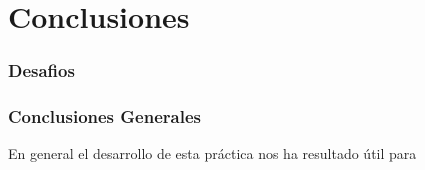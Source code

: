 \part{Conclusiones}

\section{Desafios}


\section{Conclusiones Generales}
En general el desarrollo de esta práctica nos ha resultado útil para 



\newpage
